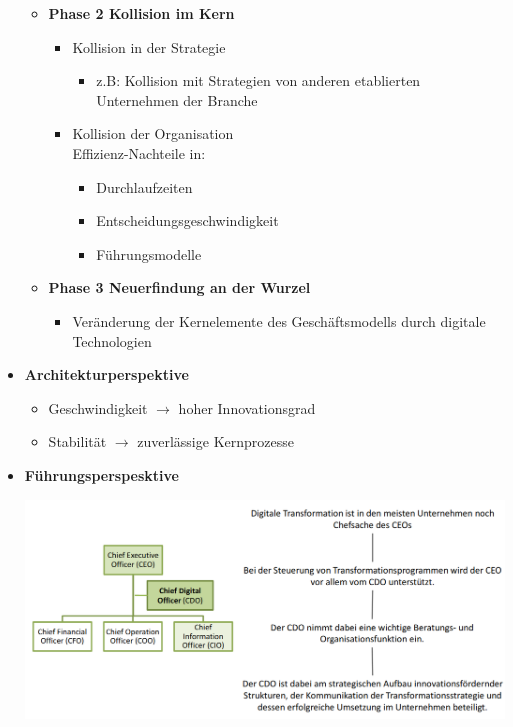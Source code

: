 \documentclass[a4]{scrartcl}
\begin{document}
\begin{itemize}
\begin{itemize}
\begin{itemize}
\end{itemize}

\item \textbf{Phase 2 Kollision im Kern}

\begin{itemize}
\item Kollision in der Strategie

\begin{itemize}
\item z.B: Kollision mit Strategien von anderen etablierten Unternehmen der Branche
\end{itemize}

\item Kollision der Organisation \\
Effizienz-Nachteile in:

\begin{itemize}
\item Durchlaufzeiten
\item Entscheidungsgeschwindigkeit
\item Führungsmodelle
\end{itemize}



\end{itemize}





\item \textbf{Phase 3 Neuerfindung an der Wurzel}

\begin{itemize}
\item Veränderung der Kernelemente des Geschäftsmodells durch digitale Technologien
\end{itemize}

\end{itemize}

\item \textbf{Architekturperspektive}

\begin{itemize}
\item Geschwindigkeit  $\rightarrow$ hoher Innovationsgrad
\item Stabilität $\rightarrow$ zuverlässige Kernprozesse
\end{itemize}



\item \textbf{Führungsperspesktive}

\includegraphics[scale=0.3]{ceo.png}





\end{itemize}
\end{document}
